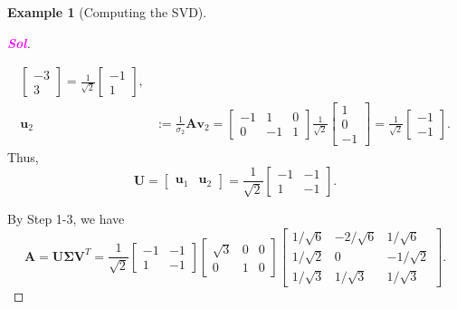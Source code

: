\documentclass[12pt,openany]{book}
\theoremstyle{definition}
\newtheorem{example}{Example}[chapter]
\newcommand{\sol}{\textcolor{magenta}{\bf Sol}}
\renewcommand{\vec}[1]{\textbf{#1}}
\begin{document}
\begin{example}[Computing the SVD]
\begin{proof}[\sol]
\begin{enumerate}[(Step 1)]
\begin{align*}
\begin{bmatrix}
			-3\\3
		\end{bmatrix}=\frac{1}{\sqrt{2}}\begin{bmatrix}
		-1\\1
	\end{bmatrix},\\
			\vec{u}_2&:=\frac{1}{\sigma_2}\textbf{A}\vec{v}_2=\begin{bmatrix}
				-1 & 1 & 0\\
				0 & -1 & 1
			\end{bmatrix}\frac{1}{\sqrt{2}}\begin{bmatrix}
				1\\0\\-1
			\end{bmatrix}=\frac{1}{\sqrt{2}}\begin{bmatrix}
				-1\\-1
			\end{bmatrix}.
			\end{align*} Thus, \[
			\textbf{U}=\begin{bmatrix}
				\vec{u}_1&\vec{u}_2
			\end{bmatrix}=\frac{1}{\sqrt{2}}\begin{bmatrix}
			-1&-1\\1&-1
		\end{bmatrix}.
			\]
			\end{enumerate}
			By Step 1-3, we have \[
			\textbf{A}=\textbf{U}\boldsymbol{\Sigma}\textbf{V}^T=\frac{1}{\sqrt{2}}\begin{bmatrix}
				-1&-1\\1&-1
			\end{bmatrix}\begin{bmatrix}
			\sqrt{3} & 0 & 0\\
			0 & 1 & 0
		\end{bmatrix}\begin{bmatrix}
		1/\sqrt{6} & -2/\sqrt{6} & 1/\sqrt{6}\\
		1/\sqrt{2} & 0 & -1/\sqrt{2}\\
		1/\sqrt{3} & 1/\sqrt{3} & 1/\sqrt{3}
	\end{bmatrix}.
			\]
		\end{proof}
	\end{example}
	
\newpage
\end{document}
